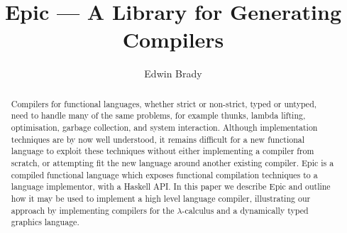 \documentclass[orivec,dvips,10pt]{llncs}
\newcounter{per}
\begin{document}
\title{Epic --- A Library for Generating Compilers}
\author{Edwin Brady}


\maketitle

\begin{abstract}
Compilers for functional languages, whether strict or non-strict,
typed or untyped, need to handle many of the same problems, for
example thunks, lambda lifting, optimisation, garbage collection, and
system interaction.  Although implementation techniques are by now
well understood, it remains difficult for a new functional language to
exploit these techniques without either implementing a compiler from
scratch, or attempting fit the new language around another existing
compiler.  Epic is a compiled functional language which exposes
functional compilation techniques to a language implementor, with a
Haskell API. In this paper we describe Epic and outline how it may be
used to implement a high level language compiler, illustrating our
approach by implementing compilers for the $\lambda$-calculus and a
dynamically typed graphics language.

\end{abstract}









%

%






\begin{small}


\appendix

%

\end{small}
\end{document}
